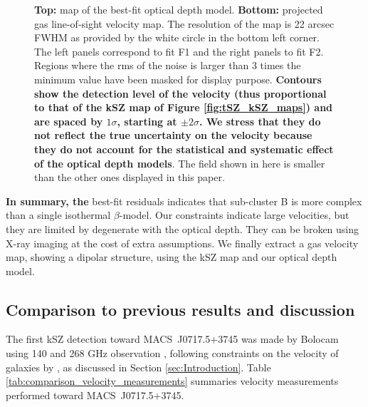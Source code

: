 \documentclass[twocolumn,traditabstract]{aa}
\begin{document}
\begin{figure}[h]
\caption{\footnotesize{{\bf Top:} map of the best-fit optical depth model. {\bf Bottom:} projected gas line-of-sight velocity map. The resolution of the map is 22 arcsec FWHM as provided by the white circle in the bottom left corner. The left panels correspond to fit F1 and the right panels to fit F2. Regions where the rms of the noise is larger than 3 times the minimum value have been masked for display purpose. {\bf Contours show the detection level of the velocity (thus proportional to that of the kSZ map of Figure \ref{fig:tSZ_kSZ_maps}) and are spaced by $1 \sigma$, starting at $\pm 2 \sigma$. We stress that they do not reflect the true uncertainty on the velocity because they do not account for the statistical and systematic effect of the optical depth models}. The field shown in here is smaller than the other ones displayed in this paper.}}
\label{fig:velocity_tau_map}
\end{figure}

{\bf In summary, the} best-fit residuals indicates that sub-cluster B is more complex than a single isothermal $\beta$-model. Our constraints indicate large velocities, but they are limited by degenerate with the optical depth. They can be broken using X-ray imaging at the cost of extra assumptions. We finally extract a gas velocity map, showing a dipolar structure, using the kSZ map and our optical depth model.

\subsection{Comparison to previous results and discussion}
The first kSZ detection toward \mbox{MACS~J0717.5+3745} was made by Bolocam using 140 and 268 GHz observation \citep{Sayers2013}, following constraints on the velocity of galaxies by \cite{Ma2009}, as discussed in Section \ref{sec:Introduction}. Table \ref{tab:comparison_velocity_measurements} summaries velocity measurements performed toward \mbox{MACS~J0717.5+3745}.
\end{document}
